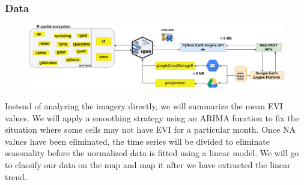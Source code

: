 \documentclass[11pt]{beamer}
\begin{document}
\begin{frame}
	\frametitle{Data}
	\begin{figure}
		\centering
		\includegraphics[width=0.7\linewidth]{images/DataExtraction}
		\caption{}
		\label{fig:dataextraction}
	\end{figure}
	
	Instead of analyzing the imagery directly, we will summarize the mean EVI values. We will apply a smoothing strategy using an ARIMA function to fix the situation where some cells may not have EVI for a particular month. Once NA values have been eliminated, the time series will be divided to eliminate seasonality before the normalized data is fitted using a linear model. We will go to classify our data on the map and map it after we have extracted the linear trend.
	
\end{frame}
\end{document}
